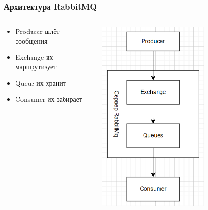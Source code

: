 \documentclass[xetex,mathserif,serif]{beamer}
\begin{document}
    \begin{frame}
        \frametitle{Архитектура RabbitMQ}
        \begin{columns}
            \begin{column}{0.6\textwidth}
                \begin{itemize}
                    \item Producer шлёт сообщения
                    \item Exchange их маршрутизует
                    \item Queue их хранит
                    \item Consumer их забирает
                \end{itemize}
            \end{column}
            \begin{column}{0.4\textwidth}
                \includegraphics[width=0.7\textwidth]{rabbitMqArchitecture.png}
            \end{column}
        \end{columns}
    \end{frame}
\end{document}
